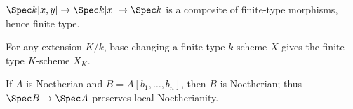 \begin{example}[Composition]\label{ex:vi26-r18}
$\Spec k[x,y]\to\Spec k[x]\to\Spec k$ is a composite of finite-type morphisms, hence finite type.
\end{example}

\begin{example}\label{ex:vi26-r19}
For any extension $K/k$, base changing a finite-type $k$-scheme $X$ gives the finite-type $K$-scheme $X_K$.
\end{example}

\begin{example}\label{ex:vi26-r20}
If $A$ is Noetherian and $B=A[b_1,\dots,b_n]$, then $B$ is Noetherian; thus $\Spec B\to\Spec A$ preserves local Noetherianity.
\end{example}